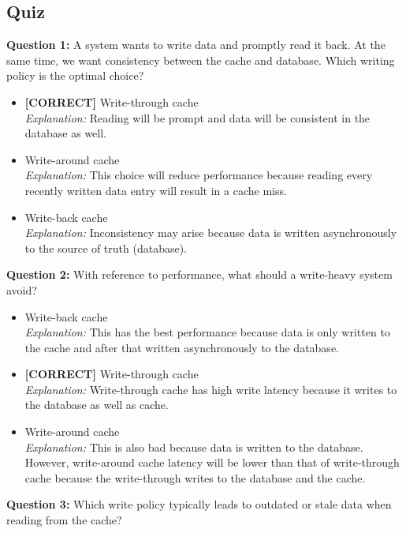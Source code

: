 \subsection*{Quiz}
\vspace{0.3cm}
\noindent
\textbf{Question 1:} A system wants to write data and promptly read it back. At the same time, we want consistency between the cache and database. Which writing policy is the optimal choice?
\\[0.2cm]
\begin{itemize}
 \item \textbf{[CORRECT]} Write-through cache
\\[0.1cm]
\textit{Explanation:} 
Reading will be prompt and data will be consistent in the database as well.
 \item Write-around cache
\\[0.1cm]
\textit{Explanation:} 
This choice will reduce performance because reading every recently written data entry will result in a cache miss.
 \item Write-back cache
\\[0.1cm]
\textit{Explanation:} 
Inconsistency may arise because data is written asynchronously to the source of truth (database).
\end{itemize}
\vspace{0.3cm}
\noindent
\textbf{Question 2:} With reference to performance, what should a write-heavy system avoid?
\\[0.2cm]
\begin{itemize}
 \item Write-back cache
\\[0.1cm]
\textit{Explanation:} 
This has the best performance because data is only written to the cache and after that written asynchronously to the database.
 \item \textbf{[CORRECT]} Write-through cache
\\[0.1cm]
\textit{Explanation:} 
Write-through cache has high write latency because it writes to the database as well as cache.
 \item Write-around cache
\\[0.1cm]
\textit{Explanation:} 
This is also bad because data is written to the database. However, write-around cache latency will be lower than that of write-through cache because the write-through writes to the database and the cache.
\end{itemize}
\vspace{0.3cm}
\noindent
\textbf{Question 3:} Which write policy typically leads to outdated or stale data when reading from the cache?
